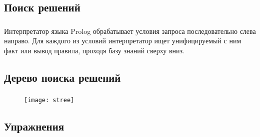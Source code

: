\subsection{Поиск решений}

\begin{frame}
	\frametitle{\insertsection}
	\framesubtitle{\insertsubsection}
	Интерпретатор языка Prolog обрабатывает условия запроса последовательно слева направо. Для каждого из условий интерпретатор ищет унифицируемый с ним факт или вывод правила, проходя базу знаний сверху вниз.
\end{frame}


\subsection{Дерево поиска решений}

\begin{frame}
	\frametitle{\insertsection}
	\framesubtitle{\insertsubsection}
	\begin{figure}
		\texttt{[image: stree]}
	\end{figure}
\end{frame}

\subsection{Упражнения}

